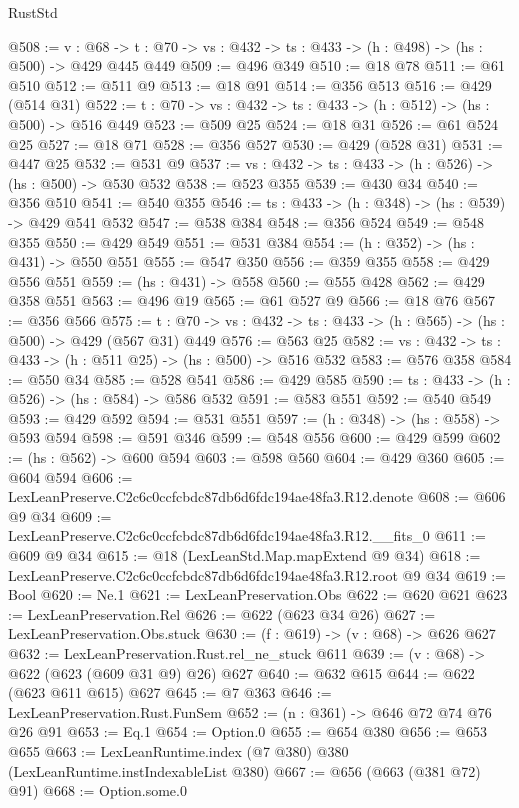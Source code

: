 \begin{lexlean}{RustStd}
\begin{coremodule}
@508 := {v : @68} ->
  {t : @70} -> {vs : @432} -> {ts : @433} -> (h : @498) -> (hs : @500) -> @429 @445 @449
@509 := @496 @349
@510 := @18 @78
@511 := @61 @510
@512 := @511 @9
@513 := @18 @91
@514 := @356 @513
@516 := @429 (@514 @31)
@522 := {t : @70} -> {vs : @432} -> {ts : @433} -> (h : @512) -> (hs : @500) -> @516 @449
@523 := @509 @25
@524 := @18 @31
@526 := @61 @524 @25
@527 := @18 @71
@528 := @356 @527
@530 := @429 (@528 @31)
@531 := @447 @25
@532 := @531 @9
@537 := {vs : @432} -> {ts : @433} -> (h : @526) -> (hs : @500) -> @530 @532
@538 := @523 @355
@539 := @430 @34
@540 := @356 @510
@541 := @540 @355
@546 := {ts : @433} -> (h : @348) -> (hs : @539) -> @429 @541 @532
@547 := @538 @384
@548 := @356 @524
@549 := @548 @355
@550 := @429 @549
@551 := @531 @384
@554 := (h : @352) -> (hs : @431) -> @550 @551
@555 := @547 @350
@556 := @359 @355
@558 := @429 @556 @551
@559 := (hs : @431) -> @558
@560 := @555 @428
@562 := @429 @358 @551
@563 := @496 @19
@565 := @61 @527 @9
@566 := @18 @76
@567 := @356 @566
@575 := {t : @70} -> {vs : @432} -> {ts : @433} -> (h : @565) -> (hs : @500) -> @429 (@567 @31) @449
@576 := @563 @25
@582 := {vs : @432} -> {ts : @433} -> (h : @511 @25) -> (hs : @500) -> @516 @532
@583 := @576 @358
@584 := @550 @34
@585 := @528 @541
@586 := @429 @585
@590 := {ts : @433} -> (h : @526) -> (hs : @584) -> @586 @532
@591 := @583 @551
@592 := @540 @549
@593 := @429 @592
@594 := @531 @551
@597 := (h : @348) -> (hs : @558) -> @593 @594
@598 := @591 @346
@599 := @548 @556
@600 := @429 @599
@602 := (hs : @562) -> @600 @594
@603 := @598 @560
@604 := @429 @360
@605 := @604 @594
@606 := LexLeanPreserve.C2c6c0ccfcbdc87db6d6fdc194ae48fa3.R12.denote
@608 := @606 @9 @34
@609 := LexLeanPreserve.C2c6c0ccfcbdc87db6d6fdc194ae48fa3.R12.__fits_0
@611 := @609 @9 @34
@615 := @18 (LexLeanStd.Map.mapExtend @9 @34)
@618 := LexLeanPreserve.C2c6c0ccfcbdc87db6d6fdc194ae48fa3.R12.root @9 @34
@619 := Bool
@620 := Ne.{1}
@621 := LexLeanPreservation.Obs
@622 := @620 @621
@623 := LexLeanPreservation.Rel
@626 := @622 (@623 @34 @26)
@627 := LexLeanPreservation.Obs.stuck
@630 := (f : @619) -> (v : @68) -> @626 @627
@632 := LexLeanPreservation.Rust.rel_ne_stuck @611
@639 := (v : @68) -> @622 (@623 (@609 @31 @9) @26) @627
@640 := @632 @615
@644 := @622 (@623 @611 @615) @627
@645 := @7 @363
@646 := LexLeanPreservation.Rust.FunSem
@652 := (n : @361) -> @646 @72 @74 @76 @26 @91
@653 := Eq.{1}
@654 := Option.{0}
@655 := @654 @380
@656 := @653 @655
@663 := LexLeanRuntime.index (@7 @380) @380 (LexLeanRuntime.instIndexableList @380)
@667 := @656 (@663 (@381 @72) @91)
@668 := Option.some.{0}

\end{coremodule}
\end{lexlean}
